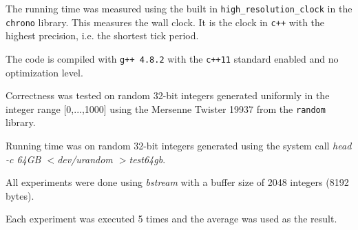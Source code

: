 \documentclass[a4paper,oneside,article,11pt]{memoir}
\begin{document}
The running time was measured using the built in \texttt{high\_resolution\_clock} in the \texttt{chrono} library. This measures the wall clock. It is the clock in \texttt{c++} with the highest precision, i.e. the shortest tick period.

The code is compiled with \texttt{g++ 4.8.2} with the \texttt{c++11} standard enabled and no optimization level.

Correctness was tested on random 32-bit integers generated uniformly in the integer range [0,...,1000] using the Mersenne Twister 19937 from the \texttt{random} library.

Running time was on random 32-bit integers generated using the system call \textit{head -c 64GB $<$dev/urandom $>$test64gb}.

All experiments were done using \textit{bstream} with a buffer size of 2048 integers (8192 bytes).

Each experiment was executed 5 times and the average was used as the result.



\end{document}
